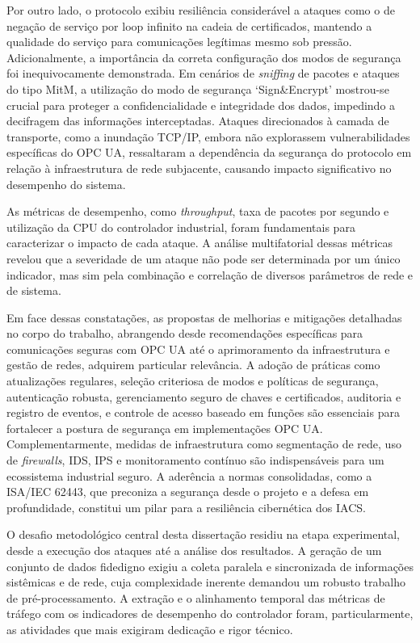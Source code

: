     Por outro lado, o protocolo exibiu resiliência considerável a ataques como o de negação de serviço por loop infinito na cadeia de certificados, mantendo a qualidade do serviço para comunicações legítimas mesmo sob pressão. Adicionalmente, a importância da correta configuração dos modos de segurança foi inequivocamente demonstrada. Em cenários de \textit{sniffing} de pacotes e ataques do tipo MitM, a utilização do modo de segurança `Sign\&Encrypt' mostrou-se crucial para proteger a confidencialidade e integridade dos dados, impedindo a decifragem das informações interceptadas. Ataques direcionados à camada de transporte, como a inundação TCP/IP, embora não explorassem vulnerabilidades específicas do OPC UA, ressaltaram a dependência da segurança do protocolo em relação à infraestrutura de rede subjacente, causando impacto significativo no desempenho do sistema.  

    As métricas de desempenho, como \textit{throughput}, taxa de pacotes por segundo e utilização da CPU do controlador industrial, foram fundamentais para caracterizar o impacto de cada ataque. A análise multifatorial dessas métricas revelou que a severidade de um ataque não pode ser determinada por um único indicador, mas sim pela combinação e correlação de diversos parâmetros de rede e de sistema.  

    Em face dessas constatações, as propostas de melhorias e mitigações detalhadas no corpo do trabalho, abrangendo desde recomendações específicas para comunicações seguras com OPC UA até o aprimoramento da infraestrutura e gestão de redes, adquirem particular relevância. A adoção de práticas como atualizações regulares, seleção criteriosa de modos e políticas de segurança, autenticação robusta, gerenciamento seguro de chaves e certificados, auditoria e registro de eventos, e controle de acesso baseado em funções são essenciais para fortalecer a postura de segurança em implementações OPC UA. Complementarmente, medidas de infraestrutura como segmentação de rede, uso de \textit{firewalls}, IDS, IPS e monitoramento contínuo são indispensáveis para um ecossistema industrial seguro. A aderência a normas consolidadas, como a ISA/IEC 62443, que preconiza a segurança desde o projeto e a defesa em profundidade, constitui um pilar para a resiliência cibernética dos IACS.

    O desafio metodológico central desta dissertação residiu na etapa experimental, desde a execução dos ataques até a análise dos resultados. A geração de um conjunto de dados fidedigno exigiu a coleta paralela e sincronizada de informações sistêmicas e de rede, cuja complexidade inerente demandou um robusto trabalho de pré-processamento. A extração e o alinhamento temporal das métricas de tráfego com os indicadores de desempenho do controlador foram, particularmente, as atividades que mais exigiram dedicação e rigor técnico.

